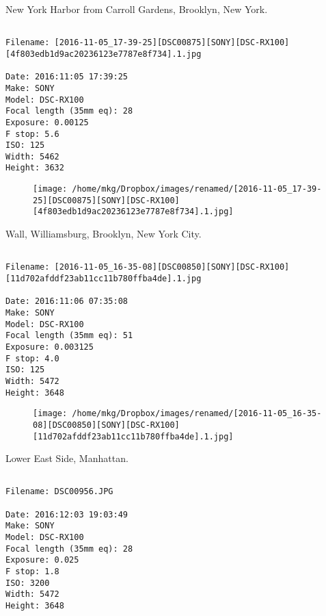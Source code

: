\clearpage
\onecolumn
\noindent New York Harbor from Carroll Gardens, Brooklyn, New York.
\noindent
\begin{lstlisting}

Filename: [2016-11-05_17-39-25][DSC00875][SONY][DSC-RX100][4f803edb1d9ac20236123e7787e8f734].1.jpg

Date: 2016:11:05 17:39:25
Make: SONY
Model: DSC-RX100
Focal length (35mm eq): 28
Exposure: 0.00125
F stop: 5.6
ISO: 125
Width: 5462
Height: 3632
\end{lstlisting}
\clearpage

\begin{figure}
\texttt{[image: /home/mkg/Dropbox/images/renamed/[2016-11-05\_17-39-25][DSC00875][SONY][DSC-RX100][4f803edb1d9ac20236123e7787e8f734].1.jpg]}
\end{figure}
    
\clearpage
\onecolumn
\noindent Wall, Williamsburg, Brooklyn, New York City.
\noindent
\begin{lstlisting}

Filename: [2016-11-05_16-35-08][DSC00850][SONY][DSC-RX100][11d702afddf23ab11cc11b780ffba4de].1.jpg

Date: 2016:11:06 07:35:08
Make: SONY
Model: DSC-RX100
Focal length (35mm eq): 51
Exposure: 0.003125
F stop: 4.0
ISO: 125
Width: 5472
Height: 3648
\end{lstlisting}
\clearpage

\begin{figure}
\texttt{[image: /home/mkg/Dropbox/images/renamed/[2016-11-05\_16-35-08][DSC00850][SONY][DSC-RX100][11d702afddf23ab11cc11b780ffba4de].1.jpg]}
\end{figure}
    
\clearpage
\onecolumn
\noindent Lower East Side, Manhattan.
\noindent
\begin{lstlisting}

Filename: DSC00956.JPG

Date: 2016:12:03 19:03:49
Make: SONY
Model: DSC-RX100
Focal length (35mm eq): 28
Exposure: 0.025
F stop: 1.8
ISO: 3200
Width: 5472
Height: 3648
\end{lstlisting}
\clearpage

